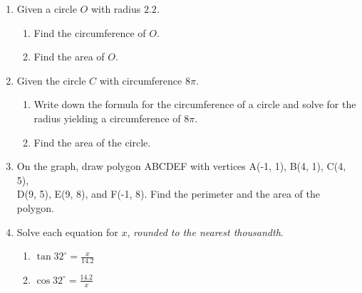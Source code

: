 \begin{enumerate}
\item Given a circle $O$ with radius $2.2$.
\begin{enumerate}
  \item Find the circumference of $O$. \vspace{2cm}
  \item Find the area of $O$.
\end{enumerate}

\newpage
\item Given the circle $C$ with circumference $8\pi$.
\begin{enumerate}
  \item Write down the formula for the circumference of a circle and solve for the radius yielding a circumference of $8\pi$. \vspace{1cm}
  \item Find the area of the circle.
\end{enumerate}

\item On the graph, draw polygon ABCDEF with vertices A(-1, 1), B(4, 1),
C(4, 5), \\ D(9, 5), E(9, 8), and F(-1, 8). Find the perimeter and the area of the polygon.\\[1cm]
\vspace{2cm}

\item Solve each equation for $x$, \emph{rounded to the nearest thousandth}.  \vspace{.25cm}
  \begin{multicols}{2}
    \begin{enumerate}
      \item $\displaystyle \tan 32^\circ = \frac{x}{14.2}$
      \item $\displaystyle \cos 32^\circ = \frac{14.2}{x}$
    \end{enumerate}
  \end{multicols} \vspace{4cm}


\end{enumerate}
